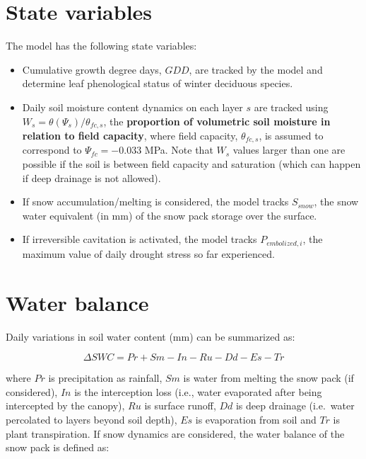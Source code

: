 \documentclass[]{book}
\providecommand{\tightlist}{%
  \setlength{\itemsep}{0pt}\setlength{\parskip}{0pt}}
\begin{document}
\section{State variables}\label{state-variables}

The model has the following state variables:

\begin{itemize}
\tightlist
\item
  Cumulative growth degree days, \(GDD\), are tracked by the model and
  determine leaf phenological status of winter deciduous species.
\item
  Daily soil moisture content dynamics on each layer \(s\) are tracked
  using \(W_s = \theta(\Psi_s)/ \theta_{fc,s}\), the \textbf{proportion
  of volumetric soil moisture in relation to field capacity}, where
  field capacity, \(\theta_{fc,s}\), is assumed to correspond to
  \(\Psi_{fc} = -0.033\) MPa. Note that \(W_s\) values larger than one
  are possible if the soil is between field capacity and saturation
  (which can happen if deep drainage is not allowed).
\item
  If snow accumulation/melting is considered, the model tracks
  \(S_{snow}\), the snow water equivalent (in mm) of the snow pack
  storage over the surface.
\item
  If irreversible cavitation is activated, the model tracks
  \(P_{embolized,i}\), the maximum value of daily drought stress so far
  experienced.
\end{itemize}

\section{Water balance}\label{water-balance}

Daily variations in soil water content (mm) can be summarized as:

\begin{equation}
\Delta{SWC} = Pr + Sm - In - Ru - Dd - Es -Tr
\end{equation}

where \(Pr\) is precipitation as rainfall, \(Sm\) is water from melting
the snow pack (if considered), \(In\) is the interception loss (i.e.,
water evaporated after being intercepted by the canopy), \(Ru\) is
surface runoff, \(Dd\) is deep drainage (i.e.~water percolated to layers
beyond soil depth), \(Es\) is evaporation from soil and \(Tr\) is plant
transpiration. If snow dynamics are considered, the water balance of the
snow pack is defined as:
\end{document}
